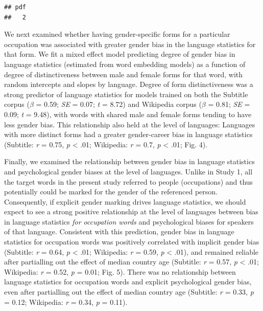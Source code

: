 \documentclass[man,floatsintext]{apa6}
\begin{document}
\begin{verbatim}
## pdf 
##   2
\end{verbatim}

We next examined whether having gender-specific forms for a particular occupation was associated with greater gender bias in the language statistics for that form. We fit a mixed effect model predicting degree of gender bias in language statistics (estimated from word embedding models) as a function of degree of distinctiveness between male and female forms for that word, with random intercepts and slopes by language. Degree of form distinctiveness was a strong predictor of language statistics for models trained on both the Subtitle corpus (\(\beta\) = 0.59; \emph{SE} = 0.07; \emph{t} = 8.72) and Wikipedia corpus (\(\beta\) = 0.81; \emph{SE} = 0.09; \emph{t} = 9.48), with words with shared male and female forms tending to have less gender bias. This relationship also held at the level of languages: Languages with more distinct forms had a greater gender-career bias in language statistics (Subtitle: \emph{r} = 0.75, \emph{p} \textless{} .01; Wikipedia: \emph{r} = 0.7, \emph{p} \textless{} .01; Fig. 4).

Finally, we examined the relationship between gender bias in language statistics and psychological gender biases at the level of languages. Unlike in Study 1, all the target words in the present study referred to people (occupations) and thus potentially could be marked for the gender of the referenced person. Consequently, if explicit gender marking drives language statistics, we should expect to see a strong positive relationship at the level of languages between bias in language statistics \emph{for occupation words} and psychological biases for speakers of that language. Consistent with this prediction, gender bias in language statistics for occupation words was positively correlated with implicit gender bias (Subtitle: \emph{r} = 0.64, \emph{p} \textless{} .01; Wikipedia: \emph{r} = 0.59, \emph{p} \textless{} .01), and remained reliable after partialling out the effect of median country age (Subtitle: \emph{r} = 0.57, \emph{p} \textless{} .01; Wikipedia: \emph{r} = 0.52, \emph{p} = 0.01; Fig. 5). There was no relationship between language statistics for occupation words and explicit psychological gender bias, even after partialling out the effect of median country age (Subtitle: \emph{r} = 0.33, \emph{p} = 0.12; Wikipedia: \emph{r} = 0.34, \emph{p} = 0.11).
\end{document}

